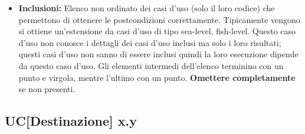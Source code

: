 \documentclass[a4paper, oneside]{article} %
\begin{document}
\begin{itemize}
\item \textbf{Inclusioni:} Elenco non ordinato dei casi d'uso (solo il loro codice) che permettono di ottenere le postcondizioni correttamente. Tipicamente vengono si ottiene un'estensione da casi d'uso di tipo sea-level, fish-level. Questo caso d'uso non conosce i dettagli dei casi d'uso inclusi ma solo i loro risultati; questi casi d'uso non sanno di essere inclusi quindi la loro esecuzione dipende da questo caso d'uso. Gli elementi intermedi dell'elenco terminino con un punto e virgola, mentre l'ultimo con un punto. \textbf{Omettere completamente} se non presenti.
\end{itemize}

\subsection{UC[Destinazione] x.y}%
\end{document}
